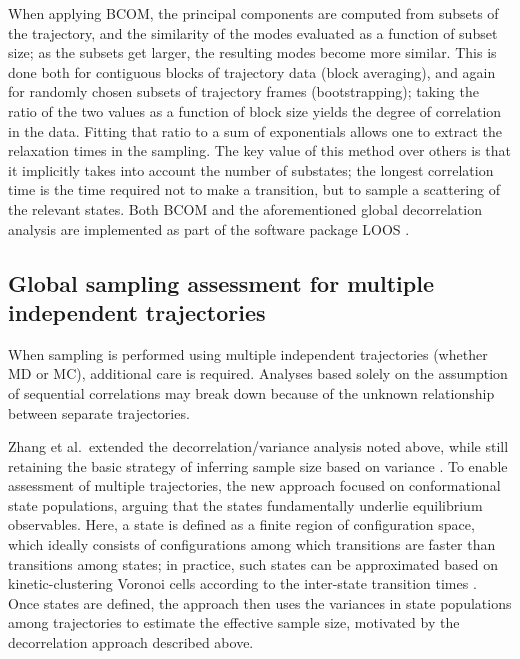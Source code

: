 When applying BCOM, the principal components are computed from subsets of the trajectory, and the similarity of the modes evaluated as a function of subset size; as the subsets get larger, the resulting modes become more similar.  This is done both for contiguous blocks of trajectory data (block averaging), and again for randomly chosen subsets of trajectory frames (bootstrapping); taking the ratio of the two values as a function of block size yields the degree of correlation in the data.  Fitting that ratio to a sum of exponentials allows one to extract the relaxation times in the sampling.  The key value of this method over others is that it implicitly takes into account the number of substates; the longest correlation time is the time required not to make a transition, but to sample a scattering of the relevant states. Both BCOM and the aforementioned global decorrelation analysis are implemented as part of the software package LOOS \cite{LOOS,LOOS-JCC}.

\subsection{Global sampling assessment for multiple independent trajectories}
\label{sec:globalMultiTraj}
When sampling is performed using multiple independent trajectories (whether MD or MC), additional care is required.
Analyses based solely on the assumption of sequential correlations may break down because of the unknown relationship between separate trajectories.

Zhang et al.\ extended the decorrelation/variance analysis noted above, while still retaining the basic strategy of inferring sample size based on variance \cite{Zhang2010}.
To enable assessment of multiple trajectories, the new approach focused on conformational state populations, arguing that the states fundamentally underlie equilibrium observables.
Here, a state is defined as a finite region of configuration space, which ideally consists of configurations among which transitions are faster than transitions among states; 
in practice, such states can be approximated based on kinetic-clustering Voronoi cells according to the inter-state transition times \cite{Zhang2010}.
Once states are defined, the approach then uses the variances in state populations among trajectories to estimate the effective sample size, motivated by the decorrelation approach \cite{Lyman2007a} described above.


